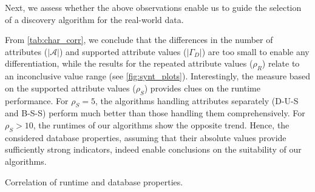 Next, we assess whether the above observations enable us to guide the
selection of a discovery algorithm for the real-world data.

From \autoref{tab:char_corr}, we conclude that the
differences in the number of attributes ($|\mathcal{A}|$) and supported
attribute values ($|\Gamma_D|$) are too small to enable any differentiation,
while the results for the repeated attribute values ($\rho_R$) relate to
an inconclusive value range (see \autoref{fig:synt_plots}). Interestingly,
the measure based on the supported attribute values ($\rho_S$) provides
clues on the runtime performance. For $\rho_S=5$, the algorithms
handling attributes separately (D-U-S and B-S-S) perform much better than
those handling them comprehensively. For $\rho_S>10$, the runtimes of our
algorithms show the opposite trend.
Hence, the considered database
properties, assuming that their absolute values provide sufficiently strong
indicators, indeed enable conclusions on the suitability of our algorithms.

\begin{table}[t]
	\footnotesize
	\caption{Correlation of runtime and database properties.}
	\label{tab:char_corr}
	\vspace{-1.5em}
	
	\vspace{-1.5em}
\end{table}

